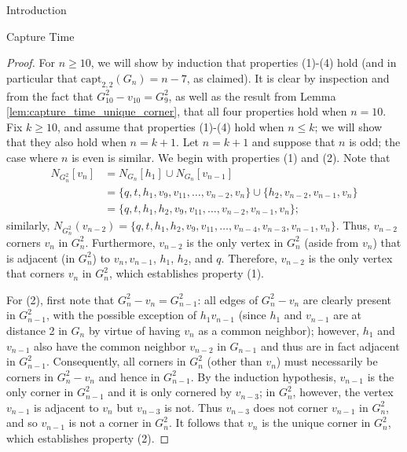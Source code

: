 \documentclass[12pt]{amsart}
\newcommand{\comment}[1]{\textcolor{red}{#1}}
\theoremstyle{definition}
\newcommand{\capt}[1]{\mathrm{capt}_{#1,#1}}
\begin{document}
\begin{section}{Introduction}
\begin{section}{Capture Time}
\begin{proof}
    For $n \ge 10$, we will show by induction that properties (1)-(4) hold (and in particular that $\capt{2}(G_n) = n-7$, as claimed).  It is clear by inspection and from the fact that $G_{10}^2-v_{10}=G_{9}^2$, as well as the result from Lemma \ref{lem:capture_time_unique_corner}, that all four properties hold when $n=10$.  Fix $k \ge 10$, and assume that properties (1)-(4) hold when $n \le k$; we will show that they also hold when $n=k+1$.  Let $n=k+1$ and suppose that $n$ is odd; the case where $n$ is even is similar.   We begin with properties (1) and (2).  Note that 
    \begin{align*}
    N_{G_n^2}[v_n] &= N_{G_n}[h_1] \cup N_{G_n}[v_{n-1}]\\
                   &= \{q,t,h_1,v_9,v_{11},\dots,v_{n-2},v_n\} \cup \{h_2,v_{n-2},v_{n-1},v_n\}\\
                   &= \{q,t,h_1,h_2,v_9,v_{11},\dots,v_{n-2},v_{n-1},v_n\};
    \end{align*}
    similarly, $N_{G_n^2}(v_{n-2})=\{q,t,h_1,h_2,v_9,v_{11},\dots,v_{n-4},v_{n-3},v_{n-1},v_n\}$.  Thus, $v_{n-2}$ corners $v_n$ in $G_n^2$.  Furthermore, $v_{n-2}$ is the only vertex in $G_n^2$ (aside from $v_n$) that is adjacent (in $G_n^2$) to $v_n, v_{n-1}$, $h_1$, $h_2$, and $q$.  
    Therefore, $v_{n-2}$ is the only vertex that corners $v_n$ in $G_n^2$, which establishes property (1).  
    
    For (2), first note that $G_n^2-v_n = G_{n-1}^2$: all edges of $G_n^2-v_n$ are clearly present in $G_{n-1}^2$, with the possible exception of $h_1 v_{n-1}$ (since $h_1$ and $v_{n-1}$ are at distance 2 in $G_n$ by virtue of having $v_n$ as a common neighbor); however, $h_1$ and $v_{n-1}$ also have the common neighbor $v_{n-2}$ in $G_{n-1}$ and thus are in fact adjacent in $G_{n-1}^2$.  Consequently, all corners in $G_n^2$ (other than $v_n$) must necessarily be corners in $G_n^2-v_n$ and hence in $G_{n-1}^2$.  By the induction hypothesis, $v_{n-1}$ is the only corner in $G_{n-1}^2$ and it is only cornered by $v_{n-3}$; in $G_n^2$, however, the vertex $v_{n-1}$ is adjacent to $v_n$ but $v_{n-3}$ is not.  Thus $v_{n-3}$ does not corner $v_{n-1}$ in $G_n^2$, and so $v_{n-1}$ is not a corner in $G_n^2$.  It follows that $v_n$ is the unique corner in $G_n^2$, which establishes property (2).   
    

\end{proof}
\end{section}
\end{section}
\end{document}
